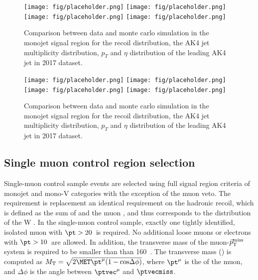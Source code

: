 \begin{figure}[htbp]
    \begin{center}
        \texttt{[image: fig/placeholder.png]}
        \texttt{[image: fig/placeholder.png]} \\
        \texttt{[image: fig/placeholder.png]}
        \texttt{[image: fig/placeholder.png]}
    \end{center}
    \caption{Comparison between data and monte carlo simulation in the monojet signal region for
        the recoil distribution, the AK4 jet multiplicity distribution,  $p_T$ and $\eta$
        distribution of the leading AK4  jet in 2017 dataset.}
    \label{fig:SR_pre_monojet_2018}
\end{figure}

\begin{figure}[htbp]
    \begin{center}
        \texttt{[image: fig/placeholder.png]}
        \texttt{[image: fig/placeholder.png]} \\
        \texttt{[image: fig/placeholder.png]}
        \texttt{[image: fig/placeholder.png]}
    \end{center}
    \caption{Comparison between data and monte carlo simulation in the monojet signal region for
        the recoil distribution, the AK4 jet multiplicity distribution,  $p_T$ and $\eta$
        distribution of the leading AK4  jet in 2017 dataset.}
    \label{fig:SR_pre_monoV_2018}
\end{figure}

\newpage

\subsection{Single muon control region selection}
\label{sec:selection_cr_1m}

Single-muon control sample events are selected using full signal region criteria of monojet and mono-V categories with the exception of the muon veto. The \ptmiss requirement is replacement an identical requirement on the hadronic recoil, which is defined as the sum of \ptvecmiss and the muon \vpt, and thus corresponds to the distribution of the W \pt.
In the single-muon control sample, exactly one tightly identified, isolated muon with $\pt > 20$~\GeV is required. 
No additional loose muons or electrons with $\pt > 10$~\GeV are allowed.
In addition, the transverse mass of the muon-$\vec p_{\rm T}^{\rm miss}$ system is required to be smaller than than 160~\GeV.
The transverse mass (\mt) is computed as $\mt = \sqrt{2\MET \pt^{\mu} (1 - \mathrm{cos}\Delta\phi)}$, where $\pt^{\mu}$ is the \pt of the muon, and $\Delta\phi$ is the angle between $\ptvec^{\mu}$ and $\ptvecmiss$.


